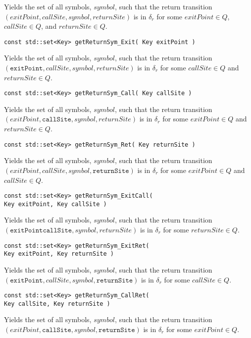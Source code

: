 \begin{description}
    Yields the set of all symbols, $symbol$, such that the return transition
    $(exitPoint,callSite,symbol,returnSite)$ is in $\delta_r$ for some
    $exitPoint \in Q$, $callSite \in Q$, and $returnSite \in Q$.

  \item\texttt{const std::set<Key> getReturnSym\_Exit( Key exitPoint )} \nopagebreak

    Yields the set of all symbols, $symbol$, such that the return transition
    $(\texttt{exitPoint},callSite,symbol,returnSite)$ is in $\delta_r$ for
    some $callSite \in Q$ and $returnSite \in Q$.

  \item\texttt{const std::set<Key> getReturnSym\_Call( Key callSite )} \nopagebreak

    Yields the set of all symbols, $symbol$, such that the return transition
    $(exitPoint,\texttt{callSite},symbol,returnSite)$ is in $\delta_r$ for
    some $exitPoint \in Q$ and $returnSite \in Q$.

  \item\texttt{const std::set<Key> getReturnSym\_Ret( Key returnSite )} \nopagebreak

    Yields the set of all symbols, $symbol$, such that the return transition
    $(exitPoint,callSite,symbol,\texttt{returnSite})$ is in $\delta_r$ for
    some $exitPoint \in Q$ and $callSite \in Q$.

  \item\texttt{const std::set<Key> getReturnSym\_ExitCall( \\ \hspace*{3.25cm} Key exitPoint, Key callSite )} \nopagebreak

    Yields the set of all symbols, $symbol$, such that the return transition
    $(\texttt{exitPoint}\texttt{callSite},symbol,returnSite)$ is in
    $\delta_r$ for some $returnSite \in Q$.

  \item\texttt{const std::set<Key> getReturnSym\_ExitRet( \\ \hspace*{3.25cm} Key exitPoint, Key returnSite )} \nopagebreak

    Yields the set of all symbols, $symbol$, such that the return transition
    $(\texttt{exitPoint},callSite,symbol,\texttt{returnSite})$ is in
    $\delta_r$ for some $callSite \in Q$.

  \item\texttt{const std::set<Key> getReturnSym\_CallRet( \\ \hspace*{3.25cm} Key callSite, Key returnSite )} \nopagebreak

    Yields the set of all symbols, $symbol$, such that the return transition
    $(exitPoint,\texttt{callSite},symbol,\texttt{returnSite})$ is in
    $\delta_r$ for some $exitPoint \in Q$. \\

\end{description}

